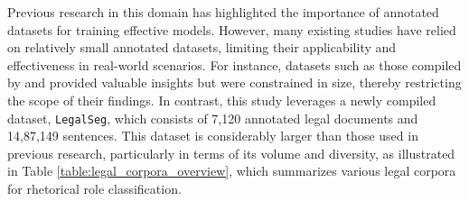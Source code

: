 Previous research in this domain has highlighted the importance of annotated datasets for training effective models. However, many existing studies have relied on relatively small annotated datasets, limiting their applicability and effectiveness in real-world scenarios. For instance, datasets such as those compiled by \citet{bhattacharya2019identification, kalamkar-etal-2022-corpus} and \citet{malik-etal-2022-semantic} provided valuable insights but were constrained in size, thereby restricting the scope of their findings. In contrast, this study leverages a newly compiled dataset, \texttt{LegalSeg}, which consists of 7,120 annotated legal documents and 14,87,149 sentences. This dataset is considerably larger than those used in previous research, particularly in terms of its volume and diversity, as illustrated in Table \ref{table:legal_corpora_overview}, which summarizes various legal corpora for rhetorical role classification.
